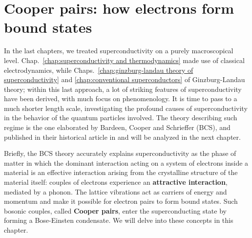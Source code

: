 \chapter{Cooper pairs: how electrons form bound states}\chaptertoc{}\label{chap: cooper pairs how electrons form bound states}

In the last chapters, we treated superconductivity on a purely macroscopical level. Chap.~\ref{chap:superconductivity and thermodynamics} made use of classical electrodynamics, while Chaps.~\ref{chap:ginzburg-landau theory of superconductivity} and \ref{chap:conventional superconductors} of Ginzburg-Landau theory; within this last approach, a lot of striking features of superconductivity have been derived, with much focus on phenomenology. It is time to pass to a much shorter length scale, investigating the profound causes of superconductivity in the behavior of the quantum particles involved. The theory describing such regime is the one elaborated by Bardeen, Cooper and Schrieffer (BCS), and published in their historical article  \cite{PhysRev.108.1175} in \citeyear{PhysRev.108.1175} and will be analyzed in the next chapter.

Briefly, the BCS theory accurately explains superconductivity as the phase of matter in which the dominant interaction acting on a system of electrons inside a material is an effective interaction arising from the crystalline structure of the material itself: couples of electrons experience an \textbf{attractive interaction}, mediated by a phonon. The lattice vibrations act as carriers of energy and momentum and make it possible for electron pairs to form bound states. Such bosonic couples, called \textbf{Cooper pairs}, enter the superconducting state by forming a Bose-Einsten condensate. We will delve into these concepts in this chapter.

